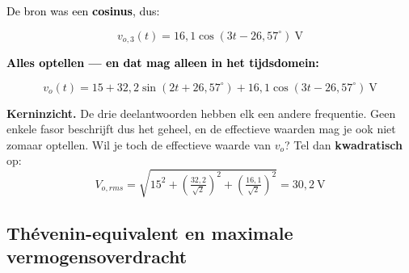 \documentclass[a4paper,11pt]{article}
\newcommand{\stapreden}[1]{\par\vspace{1.4mm}\noindent\textcolor{black}{#1}\par\vspace{-2mm}}
\begin{document}
\begin{oefening}
    \stapreden{De bron was een \textbf{cosinus}, dus:}
    \[v_{o,3}(t) = 16{,}1\cos(3t - 26{,}57^\circ)\ \text{V}\]

    \stapreden{\textbf{Alles optellen --- en dat mag alleen in het tijdsdomein:}}
    \[\boxed{v_o(t) = 15 + 32{,}2\sin(2t + 26{,}57^\circ) + 16{,}1\cos(3t - 26{,}57^\circ)\ \text{V}}\]

    \textbf{Kerninzicht.} De drie deelantwoorden hebben elk een andere frequentie. Geen enkele fasor
    beschrijft dus het geheel, en de effectieve waarden mag je ook niet zomaar optellen. Wil je toch
    de effectieve waarde van $v_o$? Tel dan \textbf{kwadratisch} op:
    \[V_{o,rms} = \sqrt{15^2 + \left(\tfrac{32{,}2}{\sqrt{2}}\right)^2 + \left(\tfrac{16{,}1}{\sqrt{2}}\right)^2} = 30{,}2\ \text{V}\]
\end{oefening}


\subsection{Thévenin-equivalent en maximale vermogensoverdracht}
\end{document}
